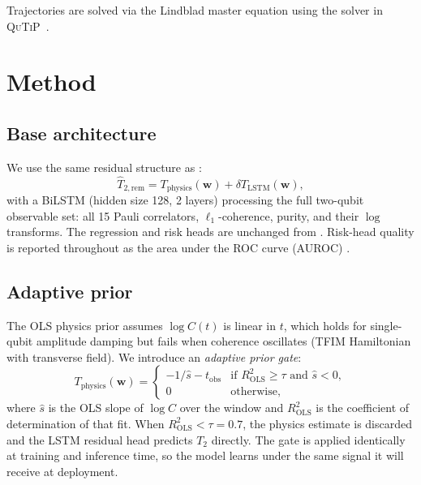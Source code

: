 \documentclass[twocolumn,10pt]{article}
\begin{document}
Trajectories are solved via the Lindblad master equation
\cite{Lindblad1976,Breuer2002} using the solver in
\textsc{QuTiP}~\cite{qutip}.

\section{Method}
\label{sec:method}

\subsection{Base architecture}

We use the same residual structure as \cite{Paper1Brusnikin}:
\begin{equation}
  \widehat{T}_{2,\mathrm{rem}}
  = T_{\mathrm{physics}}(\mathbf{w})
  + \delta T_{\mathrm{LSTM}}(\mathbf{w}),
  \label{eq:residual}
\end{equation}
with a BiLSTM \cite{HochreiterSchmidhuber1997} (hidden size 128, 2
layers) processing the full two-qubit observable set: all 15 Pauli
correlators, $\ell_1$-coherence, purity, and their $\log$ transforms.
The regression and risk heads are unchanged from \cite{Paper1Brusnikin}.
Risk-head quality is reported throughout as the area under the ROC
curve (AUROC) \cite{Fawcett2006}.

\subsection{Adaptive prior}
\label{sec:adaptive}

The OLS physics prior assumes $\log C(t)$ is linear in $t$, which holds
for single-qubit amplitude damping but fails when coherence oscillates
(TFIM Hamiltonian with transverse field).
We introduce an \emph{adaptive prior gate}:
\begin{equation}
  T_{\mathrm{physics}}(\mathbf{w}) =
  \begin{cases}
    -1/\hat{s} - t_\mathrm{obs} & \text{if } R^2_\mathrm{OLS} \geq \tau \text{ and } \hat{s} < 0,\\
    0 & \text{otherwise,}
  \end{cases}
  \label{eq:adaptive}
\end{equation}
where $\hat{s}$ is the OLS slope of $\log C$ over the window and
$R^2_\mathrm{OLS}$ is the coefficient of determination of that fit.
When $R^2_\mathrm{OLS} < \tau = 0.7$, the physics estimate is
discarded and the LSTM residual head predicts $T_2$ directly.
The gate is applied identically at training and inference time, so the
model learns under the same signal it will receive at deployment.
\end{document}
